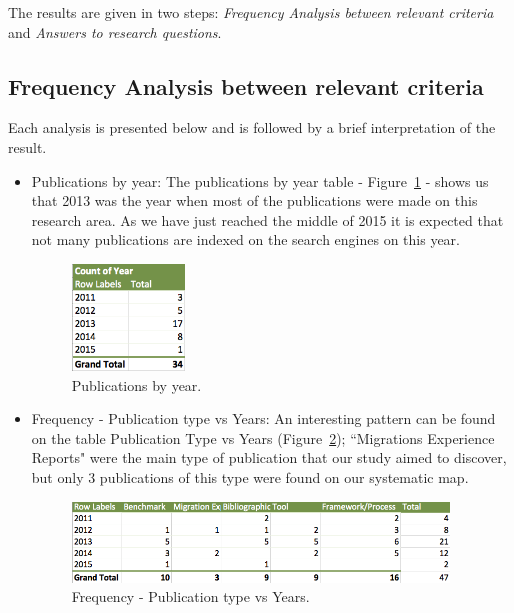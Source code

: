 \documentclass[]{tEIS2e}
\theoremstyle{plain}
\theoremstyle{remark}
\begin{document}
The results are given in two steps: \textit{Frequency Analysis between relevant criteria} and \textit{Answers to research questions}. 

\subsection{Frequency Analysis between relevant criteria}
\label{frequencyAnalysis}

Each analysis is presented below and is followed by a brief interpretation of the result. 



\begin{itemize}
\item{Publications by year: }
The publications by year table - Figure~\ref{fig:pubByYear} -  shows us that 2013 was the year when most of the publications were made on this research area. As we have just reached  the middle of 2015 it is expected that not many publications are indexed on the search engines on this year.
\begin{figure}[htb!]
\centering
\includegraphics[width=30mm]{graph2.png}
\caption{Publications by year.\label{fig:pubByYear}}
\end{figure}



\item {Frequency - Publication type vs Years: }
An interesting pattern can be found on the table Publication Type vs Years (Figure~\ref{fig:pubTypeVsYears}); ``Migrations Experience Reports" were the main type of publication that our study aimed to discover, but only 3 publications of this type were found on our systematic map. 

\begin{figure}[htb!]
\centering
\includegraphics[width=100mm]{graph1.png}
\caption{Frequency - Publication type vs Years.\label{fig:pubTypeVsYears}}
\end{figure}



\end{itemize}
\end{document}
